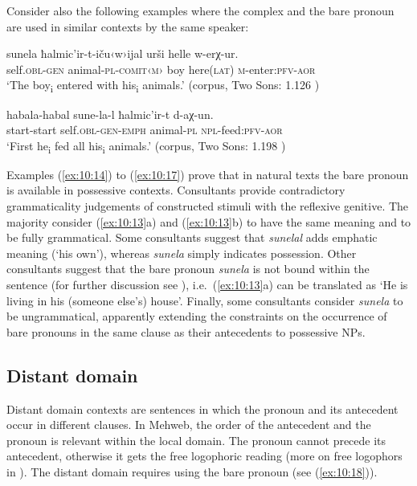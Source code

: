 ﻿\documentclass[output=paper]{langsci/langscibook}
\begin{document}
Consider also the following examples where the complex and the bare
pronoun are used in similar contexts by the same speaker:

\ea \label{ex:10:16} %
\gll  sunela ħalmic'ir-t-iču‹w›ijal urši helle w-erχ-ur.\\
self.\textsc{obl}-\textsc{gen} animal-\textsc{pl}-\textsc{comit}‹\textsc{m}› boy here(\textsc{lat}) \textsc{m}-enter:\textsc{pfv}-\textsc{aor}\\ 
\glt `The boy\textsubscript{i} entered with his\textsubscript{i} animals.'
(corpus, Two Sons: 1.126 \citep{magometov1982})

\ex \label{ex:10:17} %
\gll  habala-habal sune-la-l ħalmic'ir-t d-aχ-un.\\
start-start self.\textsc{obl}-\textsc{gen}-\textsc{emph} animal-\textsc{pl} \textsc{npl}-feed:\textsc{pfv}-\textsc{aor}\\ 
\glt `First he\textsubscript{i} fed all his\textsubscript{i} animals.'
(corpus, Two Sons: 1.198 \citep{magometov1982})
\z


Examples (\ref{ex:10:14}) to (\ref{ex:10:17}) prove that in natural texts the bare pronoun is
available in possessive contexts. Consultants provide contradictory
grammaticality judgements of constructed stimuli with the reflexive
genitive. The majority consider (\ref{ex:10:13}a) and (\ref{ex:10:13}b) to have the same meaning
and to be fully grammatical. Some consultants suggest that
\emph{sunelal} adds emphatic meaning (`his own'), whereas \emph{sunela}
simply indicates possession. Other consultants suggest that the bare
pronoun \emph{sunela} is not bound within the sentence (for further
discussion see ), i.e.\ (\ref{ex:10:13}a) can be translated as `He is living
in his (someone else's) house'. Finally, some consultants consider
\emph{sunela} to be ungrammatical, apparently extending the constraints
on the occurrence of bare pronouns in the same clause as their
antecedents to possessive NPs.
%


\subsection{Distant domain}\label{distant-domain}

Distant domain contexts are sentences in which the pronoun and its
antecedent occur in different clauses. In Mehweb, the order of the
antecedent and the pronoun is relevant within the local domain. The
pronoun cannot precede its antecedent, otherwise it gets the free
logophoric reading (more on free logophors in ). The distant
domain requires using the bare pronoun (see (\ref{ex:10:18})).
\end{document}
